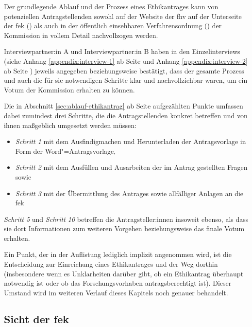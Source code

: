 \documentclass[a4paper,12pt,twoside]{scrreprt}
\begin{document}
Der grundlegende Ablauf und der Prozess eines Ethikantrages kann von potenziellen Antragstellenden sowohl auf der Website der \ac{fhv} auf der Unterseite der \ac{fek} (\cite{fachhochschule_vorarlberg_gmbh_forschungsethik-kommission_2021}) als auch in der öffentlich einsehbaren Verfahrensordnung (\cite{forschungsethik-kommission_der_fachhochschule_vorarlberg_verfahrensordnung_2020}) der Kommission in vollem Detail nachvollzogen werden.

Interviewpartner:in A und Interviewpartner:in B haben in den Einzelinterviews (siehe Anhang \ref{appendix:interview-1} ab Seite \pageref{appendix:interview-1} und Anhang \ref{appendix:interview-2} ab Seite \pageref{appendix:interview-2}) jeweils angegeben beziehungsweise bestätigt, dass der gesamte Prozess und auch die für sie notwendigen Schritte klar und nachvollziehbar waren, um ein Votum der Kommission erhalten zu können.

\medskip

Die in Abschnitt \ref{sec:ablauf-ethikantrag} ab Seite \pageref{sec:ablauf-ethikantrag} aufgezählten Punkte umfassen dabei zumindest drei Schritte, die die Antragstellenden konkret betreffen und von ihnen maßgeblich umgesetzt werden müssen:
\begin{itemize}
    \item \textit{Schritt 1} mit dem Ausfindigmachen und Herunterladen der Antragsvorlage in Form der Word"=Antragsvorlage,
    \item \textit{Schritt 2} mit dem Ausfüllen und Ausarbeiten der im Antrag gestellten Fragen sowie
    \item \textit{Schritt 3} mit der Übermittlung des Antrages sowie allfälliger Anlagen an die \ac{fek}
\end{itemize}

\noindent\textit{Schritt 5} und \textit{Schritt 10} betreffen die Antragsteller:innen insoweit ebenso, als dass sie dort Informationen zum weiteren Vorgehen beziehungsweise das finale Votum erhalten.

Ein Punkt, der in der Auflistung lediglich implizit angenommen wird, ist die Entscheidung zur Einreichung eines Ethikantrages und der Weg dorthin (insbesondere wenn es Unklarheiten darüber gibt, ob ein Ethikantrag überhaupt notwendig ist oder ob das Forschungsvorhaben antragsberechtigt ist). Dieser Umstand wird im weiteren Verlauf dieses Kapitels noch genauer behandelt.

\subsection{Sicht der \acl{fek}}
\label{sub-sec:ablauf-sicht-fek}
\end{document}
